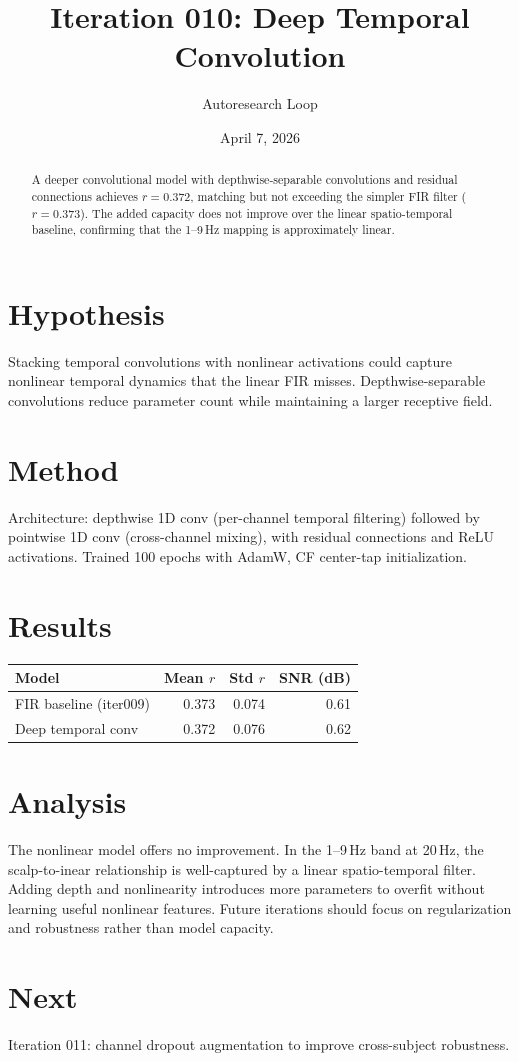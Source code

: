\documentclass[11pt,a4paper]{article}
\title{Iteration 010: Deep Temporal Convolution}
\author{Autoresearch Loop}
\date{April 7, 2026}
\begin{document}
\maketitle

\begin{abstract}
A deeper convolutional model with depthwise-separable convolutions and residual
connections achieves $r=0.372$, matching but not exceeding the simpler FIR filter
($r=0.373$). The added capacity does not improve over the linear spatio-temporal
baseline, confirming that the 1--9\,Hz mapping is approximately linear.
\end{abstract}

\section{Hypothesis}
Stacking temporal convolutions with nonlinear activations could capture nonlinear
temporal dynamics that the linear FIR misses. Depthwise-separable convolutions
reduce parameter count while maintaining a larger receptive field.

\section{Method}
Architecture: depthwise 1D conv (per-channel temporal filtering) followed by
pointwise 1D conv (cross-channel mixing), with residual connections and ReLU
activations. Trained 100 epochs with AdamW, CF center-tap initialization.

\section{Results}
\begin{table}[H]
\centering
\begin{tabular}{lrrr}
\toprule
Model & Mean $r$ & Std $r$ & SNR (dB) \\
\midrule
FIR baseline (iter009) & 0.373 & 0.074 & 0.61 \\
Deep temporal conv & 0.372 & 0.076 & 0.62 \\
\bottomrule
\end{tabular}
\end{table}

\section{Analysis}
The nonlinear model offers no improvement. In the 1--9\,Hz band at 20\,Hz,
the scalp-to-inear relationship is well-captured by a linear spatio-temporal
filter. Adding depth and nonlinearity introduces more parameters to overfit
without learning useful nonlinear features. Future iterations should focus
on regularization and robustness rather than model capacity.

\section{Next}
Iteration 011: channel dropout augmentation to improve cross-subject robustness.
\end{document}
